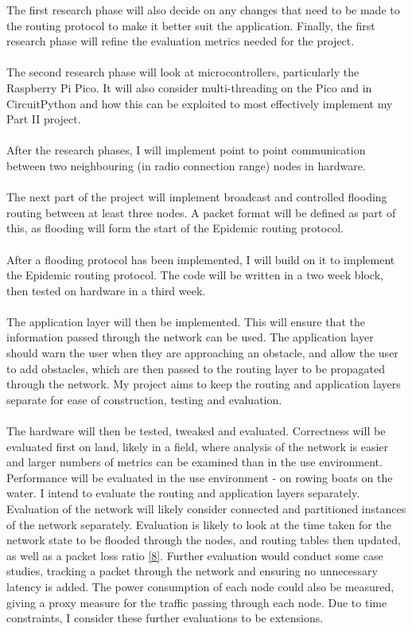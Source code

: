 \documentclass[10pt, a4paper]{article}
\begin{document}
\FloatBarrier
The first research phase will also decide on any changes that need to be made to the routing protocol to make it better suit the application. Finally, the first research phase will refine the evaluation metrics needed for the project. \\ \\
The second research phase will look at microcontrollers, particularly the Raspberry Pi Pico. It will also consider multi-threading on the Pico and in CircuitPython and how this can be exploited to most effectively implement my Part II project. \\ \\
After the research phases, I will implement point to point communication between two neighbouring (in radio connection range) nodes in hardware. \\ \\
The next part of the project will implement broadcast and controlled flooding routing between at least three nodes. A packet format will be defined as part of this, as flooding will form the start of the Epidemic routing protocol.\\ \\
After a flooding protocol has been implemented, I will build on it to implement the Epidemic routing protocol. The code will be written in a two week block, then tested on hardware in a third week. \\ \\
The application layer will then be implemented. This will ensure that the information passed through the network can be used. The application layer should warn the user when they are approaching an obstacle, and allow the user to add obstacles, which are then passed to the routing layer to be propagated through the network. My project aims to keep the routing and application layers separate for ease of construction, testing and evaluation.\\ \\
The hardware will then be tested, tweaked and evaluated. Correctness will be evaluated first on land, likely in a field, where analysis of the network is easier and larger numbers of metrics can be examined than in the use environment. Performance will be evaluated in the use environment - on rowing boats on the water. I intend to evaluate the routing and application layers separately. Evaluation of the network will likely consider connected and partitioned instances of the network separately. Evaluation is likely to look at the time taken for the network state to be flooded through the nodes, and routing tables then updated, as well as a packet loss ratio \hyperref[itu]{[8]}. Further evaluation would conduct some case studies, tracking a packet through the network and ensuring no unnecessary latency is added. The power consumption of each node could also be measured, giving a proxy measure for the traffic passing through each node. Due to time constraints, I consider these further evaluations to be extensions.
\end{document}
